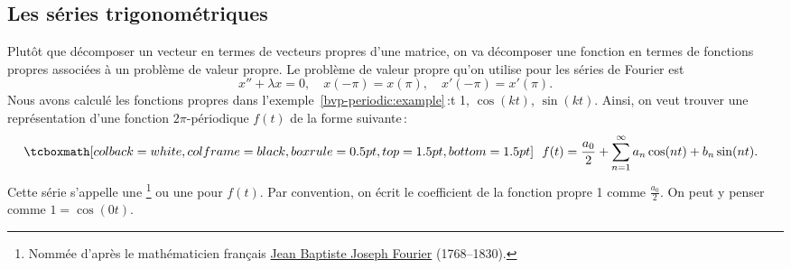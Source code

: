 \subsection{Les séries trigonométriques}

Plutôt que décomposer un vecteur en termes de vecteurs propres d'une matrice, on va décomposer une fonction en termes de fonctions propres associées à un problème de valeur propre. Le problème de valeur propre qu'on utilise pour les séries de Fourier est 
\begin{equation*}
x'' + \lambda x = 0, \quad x(-\pi) = x(\pi), \quad x'(-\pi) = x'(\pi) .
\end{equation*}
Nous avons calculé les fonctions propres dans l'exemple~\ref{bvp-periodic:example}\,:t 1, $\cos (k t)$,
$\sin (k t)$.  Ainsi, on veut trouver une représentation d'une fonction 
$2\pi$-périodique $f(t)$ de la forme suivante\,: 
\begin{equation*}
\mybxbg{~~
f(t) = \frac{a_0}{2} +
\sum_{n=1}^\infty a_n \cos (n t) + b_n \sin (n t) .
~~}
\end{equation*}
Cette série s'appelle une  \emph{}%
\footnote{Nommée d'après le mathématicien français
\href{https://en.wikipedia.org/wiki/Joseph_Fourier}{Jean Baptiste Joseph Fourier}
(1768--1830).} ou une
\emph{} pour $f(t)$.
Par convention, on écrit le coefficient de la fonction propre 1 comme $\frac{a_0}{2}$. On peut y penser comme $1 = \cos (0t)$.


